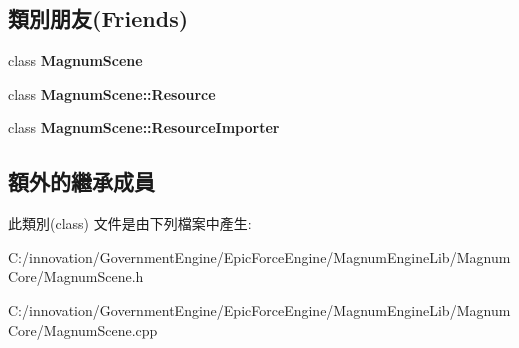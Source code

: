 \subsection*{類別朋友(Friends)}
\begin{DoxyCompactItemize}
\item 
class {\bfseries Magnum\+Scene}\hypertarget{class_i_dream_sky_1_1_magnum_scene_1_1_resource_a0f518a37dee4252bc83e1953ecf3e240}{}\label{class_i_dream_sky_1_1_magnum_scene_1_1_resource_a0f518a37dee4252bc83e1953ecf3e240}

\item 
class {\bfseries Magnum\+Scene\+::\+Resource}\hypertarget{class_i_dream_sky_1_1_magnum_scene_1_1_resource_ad6ab972c70e10994a4dc5940fd732571}{}\label{class_i_dream_sky_1_1_magnum_scene_1_1_resource_ad6ab972c70e10994a4dc5940fd732571}

\item 
class {\bfseries Magnum\+Scene\+::\+Resource\+Importer}\hypertarget{class_i_dream_sky_1_1_magnum_scene_1_1_resource_a2a9515b539dbf6a1c27e41cbdc8d4ced}{}\label{class_i_dream_sky_1_1_magnum_scene_1_1_resource_a2a9515b539dbf6a1c27e41cbdc8d4ced}

\end{DoxyCompactItemize}
\subsection*{額外的繼承成員}


此類別(class) 文件是由下列檔案中產生\+:\begin{DoxyCompactItemize}
\item 
C\+:/innovation/\+Government\+Engine/\+Epic\+Force\+Engine/\+Magnum\+Engine\+Lib/\+Magnum\+Core/Magnum\+Scene.\+h\item 
C\+:/innovation/\+Government\+Engine/\+Epic\+Force\+Engine/\+Magnum\+Engine\+Lib/\+Magnum\+Core/Magnum\+Scene.\+cpp\end{DoxyCompactItemize}
